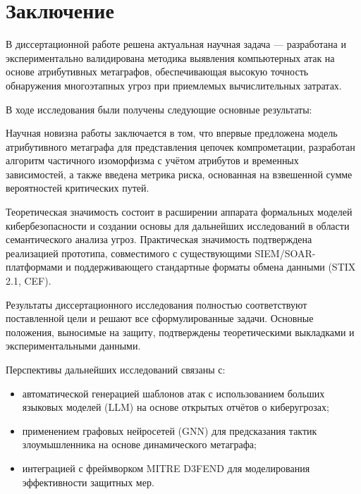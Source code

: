 \chapter*{Заключение}                       %





В диссертационной работе решена актуальная научная задача — разработана и экспериментально валидирована методика выявления компьютерных атак на основе атрибутивных метаграфов, обеспечивающая высокую точность обнаружения многоэтапных угроз при приемлемых вычислительных затратах.

В ходе исследования были получены следующие основные результаты:



Научная новизна работы заключается в том, что впервые предложена модель атрибутивного метаграфа для представления цепочек компрометации, разработан алгоритм частичного изоморфизма с учётом атрибутов и временных зависимостей, а также введена метрика риска, основанная на взвешенной сумме вероятностей критических путей.

Теоретическая значимость состоит в расширении аппарата формальных моделей кибербезопасности и создании основы для дальнейших исследований в области семантического анализа угроз. Практическая значимость подтверждена реализацией прототипа, совместимого с существующими SIEM/SOAR-платформами и поддерживающего стандартные форматы обмена данными (STIX 2.1, CEF).

Результаты диссертационного исследования полностью соответствуют поставленной цели и решают все сформулированные задачи. Основные положения, выносимые на защиту, подтверждены теоретическими выкладками и экспериментальными данными.

Перспективы дальнейших исследований связаны с:
\begin{itemize}
    \item автоматической генерацией шаблонов атак с использованием больших языковых моделей (LLM) на основе открытых отчётов о киберугрозах;
    \item применением графовых нейросетей (GNN) для предсказания тактик злоумышленника на основе динамического метаграфа;
    \item интеграцией с фреймворком MITRE D3FEND для моделирования эффективности защитных мер.
\end{itemize}

